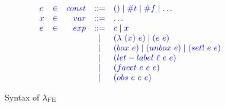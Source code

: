 \documentclass[review=true,acmlarge]{acmart}
\newcommand*{\SavedLstInline}{}
\DeclareRobustCommand*{\lstinline}{%
  \ifmmode
    \let\SavedBGroup\bgroup
    \def\bgroup{%
      \let\bgroup\SavedBGroup
      \hbox\bgroup
    }%
  \fi
  \SavedLstInline
}
\newcommand{\colorMATH}{black!20!blue}
\newcommand{\blue}[1] {{\color{\colorMATH} #1}}
\newcommand{\code}[1]{\lstinline{#1}}
\newcommand{\lang}[0]{$\lambda_\textsc{FE}$\xspace}
\begin{document}
\begin{figure}
\begin{displaymath}
  \begin{array}{lcrcl}
    \blue{c} & \blue{\in} & \blue{const} & \blue{::=} & \blue{() \mid \code{\#t} \mid \code{\#f} \mid \ldots} \\
    \blue{x} & \blue{\in} & \blue{var} & \blue{::=} & \blue{\ldots}  \\
    \blue{e} & \blue{\in} & \blue{exp} & \blue{::=} & \blue{c} \mid \blue{x} \\
    & & & \blue{\mid} & \blue{(\lambda ~ (x) ~ e) \mid (e ~ e)} \\
    & & & \blue{\mid} & \blue{(\code{box} ~ e) \mid (\code{unbox} ~ e) \mid (\code{set!} ~ e ~ e)} \\
    & & & \blue{\mid} & \blue{(\code{let-label} ~ \ell ~ e ~ e)} \\
    & & & \blue{\mid} & \blue{(\code{facet} ~ e ~ e ~ e)} \\
    & & & \blue{\mid} & \blue{(\code{obs} ~ e ~ e ~ e)} \\
  \end{array}
\end{displaymath}
\label{fig:syntax}
\caption{Syntax of \lang}
\end{figure}
\end{document}

